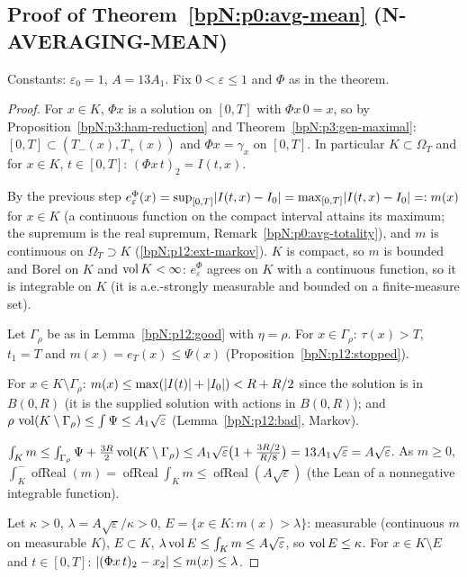\subsection{Proof of Theorem~\ref{bpN:p0:avg-mean} (N-AVERAGING-MEAN)}\label{bpN:p12:s-mean}

Constants: $\varepsilon_0=1$, $A=13A_1$. Fix $0<\varepsilon\le1$ and $\Phi$ as in the theorem.

\begin{proof}
\label{stepN:p12:me-flow} For $x\in K$, $\Phi x$ is a solution on $[0,T]$ with $\Phi x\,0=x$, so by Proposition~\ref{bpN:p3:ham-reduction} and Theorem~\ref{bpN:p3:gen-maximal}: $[0,T]\subset(T_-(x),T_+(x))$ and $\Phi x=\gamma_x$ on $[0,T]$. In particular $K\subset\Omega_T$ and for $x\in K$, $t\in[0,T]$: $(\Phi x\,t)_2=I(t,x)$.

\label{stepN:p12:me-cont} By the previous step $e^\Phi_\varepsilon(x)=\sup_{[0,T]}\lvert I(t,x)-I_0\rvert=\max_{[0,T]}\lvert I(t,x)-I_0\rvert=:m(x)$ for $x\in K$ (a continuous function on the compact interval attains its maximum; the supremum is the real supremum, Remark~\ref{bpN:p0:avg-totality}), and $m$ is continuous on $\Omega_T\supset K$ (\ref{bpN:p12:ext-markov}). $K$ is compact, so $m$ is bounded and Borel on $K$ and $\operatorname{vol} K<\infty$: $e^\Phi_\varepsilon$ agrees on $K$ with a continuous function, so it is integrable on $K$ (it is a.e.-strongly measurable and bounded on a finite-measure set).

\label{stepN:p12:me-good} Let $\Gamma_\rho$ be as in Lemma~\ref{bpN:p12:good} with $\eta=\rho$. For $x\in\Gamma_\rho$: $\tau(x)>T$, $t_1=T$ and $m(x)=e_T(x)\le\Psi(x)$ (Proposition~\ref{bpN:p12:stopped}).

\label{stepN:p12:me-bad} For $x\in K\setminus\Gamma_\rho$: $m(x)\le\max(\lvert I(t)\rvert+\lvert I_0\rvert)<R+R/2$ since the solution is in $B(0,R)$ (it is the supplied solution with actions in $B(0,R)$); and $\rho\,\operatorname{vol}(K\setminus\Gamma_\rho)\le\int\Psi\le A_1\sqrt\varepsilon$ (Lemma~\ref{bpN:p12:bad}, Markov).

\label{stepN:p12:me-mean} $\int_Km\le\int_{\Gamma_\rho}\Psi+\frac{3R}2\operatorname{vol}(K\setminus\Gamma_\rho)\le A_1\sqrt\varepsilon\bigl(1+\frac{3R/2}{R/8}\bigr)=13A_1\sqrt\varepsilon=A\sqrt\varepsilon$. As $m\ge0$, $\int^-_K\operatorname{ofReal}(m)=\operatorname{ofReal}\int_Km\le\operatorname{ofReal}(A\sqrt\varepsilon)$ (the Lean  of a nonnegative integrable function).

\label{stepN:p12:me-markov} Let $\kappa>0$, $\lambda=A\sqrt\varepsilon/\kappa>0$, $E=\{x\in K:m(x)>\lambda\}$: measurable (continuous $m$ on measurable $K$), $E\subset K$, $\lambda\operatorname{vol} E\le\int_Km\le A\sqrt\varepsilon$, so $\operatorname{vol} E\le\kappa$. For $x\in K\setminus E$ and $t\in[0,T]$: $\lvert (\Phi x\,t)_2-x_2\rvert\le m(x)\le\lambda$.
\end{proof}

